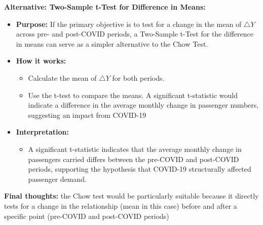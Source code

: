 \documentclass[12pt]{article}
\begin{document}
\textbf{Alternative: Two-Sample t-Test for Difference in Means:}
\begin{itemize}
    \item \textbf{Purpose: }If the primary objective is to test for a change in the mean of $\triangle Y$ across pre- and post-COVID periods, a Two-Sample t-Test for the difference in means can serve as a simpler alternative to the Chow Test.
    \item \textbf{How it works:}
    \begin{itemize}
        \item Calculate the mean of $\triangle Y$ for both periods.
        \item Use the t-test to compare the means. A significant t-statistic would indicate a difference in the average monthly change in passenger numbers, suggesting an impact from COVID-19
    \end{itemize}
    \item \textbf{Interpretation:}
    \begin{itemize}
        \item A significant t-statistic indicates that the average monthly change in passengers carried differs between the pre-COVID and post-COVID periods, supporting the hypothesis that COVID-19 structurally affected passenger demand.
    \end{itemize}
\end{itemize}
\textbf{Final thoughts:} the Chow test would be particularly suitable because it directly tests for a change in the relationship (mean in this case) before and after a specific point (pre-COVID and post-COVID periods)
\end{document}
